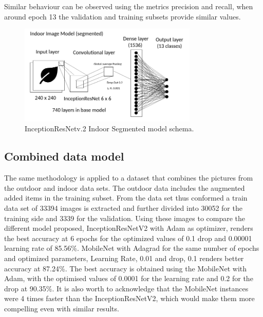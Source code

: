 \documentclass[conference]{IEEEtran}
\begin{document}
Similar behaviour can be observed using the metrics precision and recall, when around epoch 13 the validation and training subsets provide similar values.
 
\begin{figure}[htbp]
\centerline{\includegraphics[width=8.5cm]{ModelIndoorsResNet.png}}
\caption{InceptionResNetv.2 Indoor Segmented model schema.}
\label{fig}
\end{figure}

\subsection{Combined data model}

The same methodology is applied to a dataset that combines the pictures from the outdoor and indoor data sets. The outdoor data includes the augmented added items in the training subset. From the data set thus conformed a train data set of 33394 images is extracted and further divided into 30052 for the training side and 3339 for the validation. Using these images to compare the different model proposed, InceptionResNetV2 with Adam as optimizer, renders the best accuracy at 6 epochs for the optimized values of 0.1 drop and 0.00001 learning rate of 85.56\%. MobileNet with Adagrad  for the same number of epochs and optimized parameters, Learning Rate, 0.01 and drop, 0.1 renders better accuracy at 87.24\%. The best accuracy is obtained using the MobileNet with Adam, with the optimised values of 0.0001 for the learning rate and 0.2 for the drop at 90.35\%. It is also worth to acknowledge that the MobileNet instances were 4 times faster than the InceptionResNetV2, which would make them more compelling even with similar results. \
\end{document}
